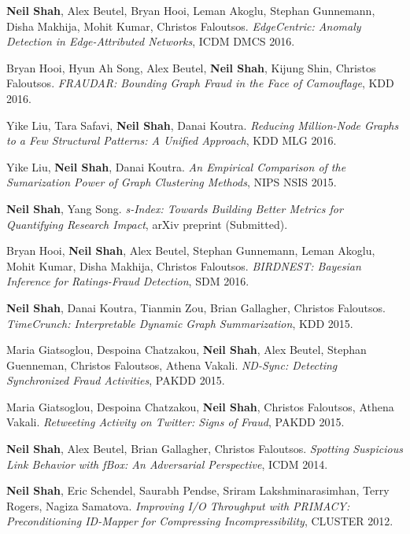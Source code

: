 \documentclass{article}
\begin{document}
\begin{etaremune}[itemsep=1pt,parsep=0pt]
\item {\bf Neil Shah}, Alex Beutel, Bryan Hooi, Leman Akoglu, Stephan Gunnemann, Disha Makhija, Mohit Kumar, Christos Faloutsos. \emph{EdgeCentric: Anomaly Detection in Edge-Attributed Networks}, ICDM DMCS 2016.

\item Bryan Hooi, Hyun Ah Song, Alex Beutel, {\bf Neil Shah}, Kijung Shin, Christos Faloutsos. \emph{FRAUDAR: Bounding Graph Fraud in the Face of Camouflage}, KDD 2016.

\item Yike Liu, Tara Safavi, {\bf Neil Shah}, Danai Koutra. \emph{Reducing Million-Node Graphs to a Few Structural Patterns: A Unified Approach}, KDD MLG 2016.

\item Yike Liu, {\bf Neil Shah}, Danai Koutra. \emph{An Empirical Comparison of the Sumarization Power of Graph Clustering Methods}, NIPS NSIS 2015.

\item {\bf Neil Shah}, Yang Song. \emph{s-Index: Towards Building Better Metrics for Quantifying Research Impact}, arXiv preprint (Submitted).

\item Bryan Hooi, {\bf Neil Shah}, Alex Beutel, Stephan Gunnemann, Leman Akoglu, Mohit Kumar, Disha Makhija, Christos Faloutsos. \emph{BIRDNEST: Bayesian Inference for Ratings-Fraud Detection}, SDM 2016.

\item {\bf Neil Shah}, Danai Koutra, Tianmin Zou, Brian Gallagher, Christos Faloutsos. \emph{TimeCrunch: Interpretable Dynamic Graph Summarization}, KDD 2015.

\item Maria Giatsoglou, Despoina Chatzakou, {\bf Neil Shah}, Alex Beutel, Stephan Guenneman, Christos Faloutsos, Athena Vakali. \emph{ND-Sync: Detecting Synchronized Fraud Activities}, PAKDD 2015.

\item Maria Giatsoglou, Despoina Chatzakou, {\bf Neil Shah}, Christos Faloutsos, Athena Vakali. \emph{Retweeting Activity on Twitter: Signs of Fraud}, PAKDD 2015.

\item {\bf Neil Shah}, Alex Beutel, Brian Gallagher, Christos Faloutsos. \emph{Spotting Suspicious Link Behavior with fBox: An Adversarial Perspective}, ICDM 2014.

\item {\bf Neil Shah}, Eric Schendel, Saurabh Pendse, Sriram Lakshminarasimhan, Terry Rogers, Nagiza Samatova. \emph{Improving I/O Throughput with PRIMACY: Preconditioning ID-Mapper for Compressing Incompressibility}, CLUSTER 2012.


\end{etaremune}
\end{document}
